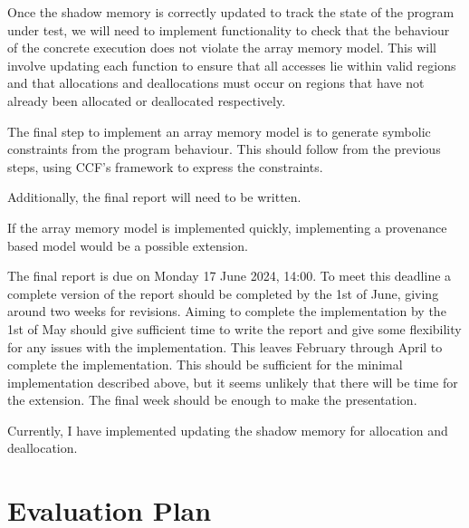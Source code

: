 \documentclass[12pt,twoside]{report}
\begin{document}
Once the shadow memory is correctly updated to track the state of the program under test, we will need to implement functionality to check that the behaviour of the concrete execution does not violate the array memory model. This will involve updating each function to ensure that all accesses lie within valid regions and that allocations and deallocations must occur on regions that have not already been allocated or deallocated respectively.

The final step to implement an array memory model is to generate symbolic constraints from the program behaviour. This should follow from the previous steps, using CCF's framework to express the constraints. 

Additionally, the final report will need to be written.

If the array memory model is implemented quickly, implementing a provenance based model would be a possible extension.


The final report is due on Monday 17 June 2024, 14:00. To meet this deadline a complete version of the report should be completed by the 1st of June, giving around two weeks for revisions. Aiming to complete the implementation by the 1st of May should give sufficient time to write the report and give some flexibility for any issues with the implementation. This leaves February through April to complete the implementation. This should be sufficient for the minimal implementation described above, but it seems unlikely that there will be time for the extension. The final week should be enough to make the presentation.

Currently, I have implemented updating the shadow memory for allocation and deallocation.

\chapter{Evaluation Plan}
\end{document}
